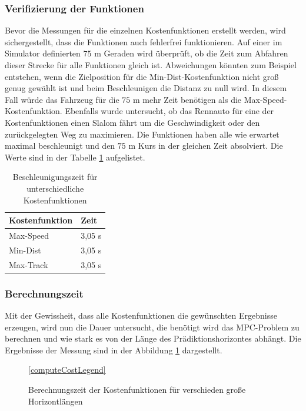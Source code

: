 \documentclass{like}
\begin{document}
\subsubsection{Verifizierung der Funktionen}
Bevor die Messungen für die einzelnen Kostenfunktionen erstellt werden, wird sicher\-ge\-stel\-lt, dass die Funktionen auch fehlerfrei funktionieren. Auf einer im Simulator definierten $75$ m Geraden wird überprüft, ob die Zeit zum Abfahren dieser Strecke für alle Funktionen gleich ist. Abweichungen könnten zum Beispiel entstehen, wenn die Zielposition für die Min-Dist-Kostenfunktion nicht groß genug gewählt ist und beim Beschleunigen die Distanz zu null wird. In diesem Fall würde das Fahrzeug für die $75$ m mehr Zeit benötigen als die Max-Speed-Kostenfunktion. Ebenfalls wurde untersucht, ob das Rennauto für eine der Kostenfunktionen einen Slalom fährt um die Geschwindigkeit oder den zurückgelegten Weg zu maximieren. Die Funktionen haben alle wie erwartet maximal beschleunigt und den $75$ m Kurs in der gleichen Zeit absolviert. Die Werte sind in der Tabelle \ref{accVerification} aufgelistet.

\begin{table}[ht!]
	\centering
	\begin{tabular}{l|l}
		\hline
		Kostenfunktion	& Zeit  \\ \hline
		Max-Speed	&	3,05 s \\
		Min-Dist	&	3,05 s \\
		Max-Track	&	3,05 s \\

	\end{tabular}
	\caption{Beschleunigungszeit für unterschiedliche Kostenfunktionen}
	\label{accVerification}
\end{table}

\subsubsection{Berechnungszeit}
\label{runtime}
Mit der Gewissheit, dass alle Kostenfunktionen die gewünschten Ergebnisse erzeugen, wird nun die Dauer untersucht, die benötigt wird das \ac{MPC}-Problem zu berechnen und wie stark es von der Länge des Prädiktionshorizontes abhängt. 
Die Ergebnisse der Messung sind in der Abbildung \ref{fig:computeCost} dargestellt.

\begin{figure}[ht!]
	\centering
	
	\ref{computeCostLegend}
	\caption{Berechnungszeit der Kostenfunktionen für verschieden große Horizontlängen}\label{fig:computeCost}
\end{figure}
\end{document}
